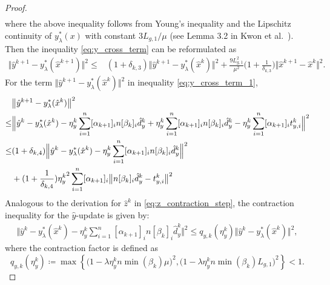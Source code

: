 \documentclass{article}
\theoremstyle{plain}
\theoremstyle{definition}
\theoremstyle{remark}
\begin{document}
\begin{proof}
\begin{align}
\end{align}
where the above inequality follows from Young's inequality and the Lipschitz continuity of $y_{\lambda}^*(x)$ with constant $3L_{g,1}/\mu$ (see Lemma 3.2 in Kwon et al.~). Then the inequality \eqref{eq:y_cross_term}  can be reformulated as
	\begin{align}\label{eq:y_cross_term_1}
		\big\Vert\hat{y}^{k+1}-y_{\lambda}^*(\hat{x}^{k+1})\big\Vert^2\leq& (1+\delta_{k,3})\big\Vert\hat{y}^{k+1}-y_{\lambda}^*(\hat{x}^{k})\big\Vert^{2}
		+\frac{9L_{g,1}^{2}}{\mu^{2}}\big(1+\frac{1}{\delta_{k,3}}\big)\big\Vert\hat{x}^{k+1}- \hat{x}^{k}\big\Vert^{2}.
	\end{align}
	For the term $\big\Vert\hat{y}^{k+1}-y_{\lambda}^*(\hat{x}^{k})\big\Vert^{2}$ in inequality \eqref{eq:y_cross_term_1},
	\begin{align}\label{eq:z_descent_decomposition}
		&\big\Vert\hat{y}^{k+1}-y_{\lambda}^*(\hat{x}^{k})\big\Vert^{2} \notag\\
		\leq
		&\Big\Vert\hat{y}^{k}- y_{\lambda}^*(\hat{x}^{k}) - \eta_y^{k}\sum_{i=1}^{n}[\alpha_{k+1}]_{i}n[\beta_{k}]_{i}\hat{d}_{y}^{k}+\eta_y^{k}\sum_{i=1}^{n}[\alpha_{k+1}]_{i}n[\beta_{k}]_{i}\hat{d}_{y}^{k} -\eta_y^{k}\sum_{i=1}^n[\alpha_{k+1}]_it_{y,i}^k \Big\Vert^{2} \notag\\
		\leq
		&(1+\delta_{k,4})\Big\Vert\hat{y}^{k}- y_{\lambda}^*(\hat{x}^{k})- \eta_y^{k}\sum_{i=1}^{n}[\alpha_{k+1}]_{i}n[\beta_{k}]_{i}\hat{d}_{y}^{k}\Big\Vert^{2}\notag\\
        &+(1+\frac{1}{\delta_{k,4}}){\eta_y^{k}}^{2}\sum_{i=1}^{n}[\alpha_{k+1}]_{i}\big\Vert n[\beta_{k}]_{i}\hat{d}_{y}^{k}- t_{y,i}^{k} \big\Vert^{2}
	\end{align}   	
 Analogous to the derivation for $\hat{z}^k$ in \eqref{eq:z_contraction_step}, the contraction inequality for the $\hat{y}$-update is given by:
\begin{align}\label{eq:y_contraction_step}
    \bigg\Vert\hat{y}^{k}- y_{\lambda}^*(\hat{x}^{k})- \eta_y^{k}\sum_{i=1}^{n}[\alpha_{k+1}]_{i}n[\beta_{k}]_{i}\hat{d}_{y}^{k}\bigg\Vert^{2}
    \leq q_{y,k}(\eta_{y}^{k})\big\Vert\hat{y}^{k}- y_{\lambda}^*(\hat{x}^{k})\big\Vert^{2},
\end{align}
where the contraction factor is defined as
\begin{equation*}
    q_{y,k}(\eta_{y}^{k}) \coloneqq \max\left\{ \big(1-\lambda\eta_{y}^{k} n\min(\beta_{k})\mu\big)^{2}, \big(1-\lambda\eta_{y}^{k} n\min(\beta_{k})L_{g,1}\big)^{2} \right\} < 1.
\end{equation*}
    

\end{proof}
\end{document}

